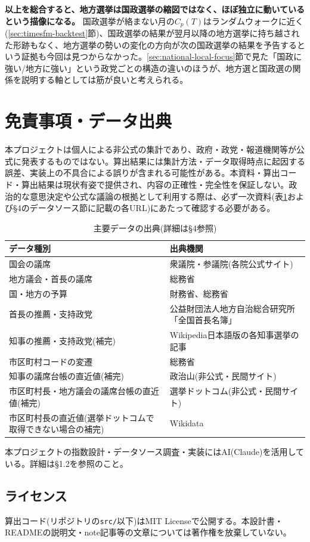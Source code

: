 \documentclass[a4paper,11pt]{ltjsarticle}
\begin{document}
\textbf{以上を総合すると、地方選挙は国政選挙の縮図ではなく、ほぼ独立に動いているという描像になる。} 国政選挙が絡まない月の$C_p(T)$はランダムウォークに近く(\ref{sec:timesfm-backtest}節)、国政選挙の結果が翌月以降の地方選挙に持ち越された形跡もなく、地方選挙の勢いの変化の方向が次の国政選挙の結果を予告するという証拠も今回は見つからなかった。\ref{sec:national-local-focus}節で見た「国政に強い/地方に強い」という政党ごとの構造の違いのほうが、地方選と国政選の関係を説明する軸としては筋が良いと考えられる。

\section{免責事項・データ出典}

本プロジェクトは個人による非公式の集計であり、政府・政党・報道機関等が公式に発表するものではない。算出結果には集計方法・データ取得時点に起因する誤差、実装上の不具合による誤りが含まれる可能性がある。本資料・算出コード・算出結果は現状有姿で提供され、内容の正確性・完全性を保証しない。政治的な意思決定や公式な議論の根拠として利用する際は、必ず一次資料(表\ref{tab:datasource-recap}および\S4のデータソース節に記載の各URL)にあたって確認する必要がある。

\begin{table}[h]
\centering
\caption{主要データの出典(詳細は\S4参照)}
\label{tab:datasource-recap}
\begin{tabular}{p{9.5cm}p{5.0cm}}
\toprule
データ種別 & 出典機関 \\
\midrule
国会の議席 & 衆議院・参議院(各院公式サイト) \\
地方議会・首長の議席 & 総務省 \\
国・地方の予算 & 財務省、総務省 \\
首長の推薦・支持政党 & 公益財団法人地方自治総合研究所「全国首長名簿」 \\
知事の推薦・支持政党(補完) & Wikipedia日本語版の各知事選挙の記事 \\
市区町村コードの変遷 & 総務省 \\
知事の議席台帳の直近値(補完) & 政治山(非公式・民間サイト) \\
市区町村長・地方議会の議席台帳の直近値(補完) & 選挙ドットコム(非公式・民間サイト) \\
市区町村長の直近値(選挙ドットコムで取得できない場合の補完) & Wikidata \\
\bottomrule
\end{tabular}
\end{table}

本プロジェクトの指数設計・データソース調査・実装にはAI(Claude)を活用している。詳細は\S1.2を参照のこと。

\subsection{ライセンス}

算出コード(リポジトリの\texttt{src/}以下)はMIT Licenseで公開する。本設計書・READMEの説明文・note記事等の文章については著作権を放棄していない。
\end{document}
